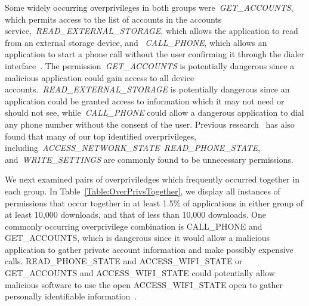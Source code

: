 \documentclass[conference]{IEEEtran}
\begin{document}
Some widely occurring overprivileges in both groups were~\emph{GET\_ACCOUNTS}, which permits access to the list of accounts in the accounts service,~\emph{READ\_EXTERNAL\_STORAGE}, which allows the application to read from an external storage device, and ~\emph{CALL\_PHONE}, which allows an application to start a phone call without the user confirming it through the dialer interface~\cite{manifest_url}. The permission~\emph{GET\_ACCOUNTS} is potentially dangerous since a malicious application could gain access to all device accounts.~\emph{READ\_EXTERNAL\_STORAGE} is potentially dangerous since an application could be granted access to information which it may not need or should not see, while~\emph{CALL\_PHONE} could allow a dangerous application to dial any phone number without the consent of the user. Previous research~\cite{Felt:2011:APD:2046707.2046779} has also found that many of our top identified overprivileges, including~\emph{ACCESS\_NETWORK\_STATE}~\emph{READ\_PHONE\_STATE}, and~\emph{WRITE\_SETTINGS} are commonly found to be unnecessary permissions.

We next examined pairs of overpriviledges which frequently occurred together in each group. In Table~\ref{Table:OverPrivsTogether}, we display all instances of permissions that occur together in at least 1.5\% of applications in either group of at least 10,000 downloads, and that of less than 10,000 downloads. One commonly occurring overprivilege combination is CALL\_PHONE and GET\_ACCOUNTS, which is dangerous since it would allow a malicious application to gather private account information and make possibly expensive calls. READ\_PHONE\_STATE and ACCESS\_WIFI\_STATE or GET\_ACCOUNTS and ACCESS\_WIFI\_STATE could potentially allow malicious software to use the open ACCESS\_WIFI\_STATE open to gather personally identifiable information~\cite{Achara:2014:SPW:2627393.2627399}.
\end{document}
